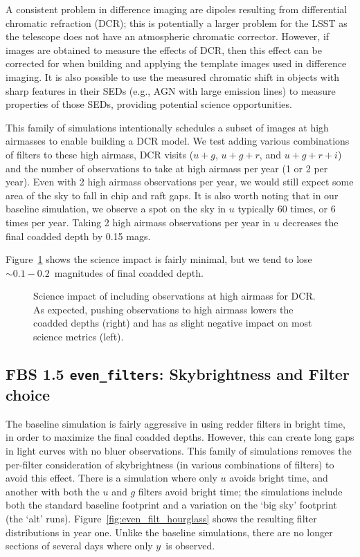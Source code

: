 A consistent problem in difference imaging are dipoles resulting from differential chromatic refraction (DCR); this is potentially a larger problem for the LSST as the telescope does not have an atmospheric chromatic corrector. However, if images are obtained to measure the effects of DCR, then this effect can be corrected for when building and applying the template images used in difference imaging. It is also possible to use the measured chromatic shift in objects with sharp features in their SEDs (e.g., AGN with large emission lines) to measure properties of those SEDs, providing potential science opportunities. 

This family of simulations intentionally schedules a subset of images at high airmasses to enable building a DCR model. We test adding various combinations of filters to these high airmass, DCR visits ($u+g$, $u+g+r$, and $u+g+r+i$) and the number of observations to take at high airmass per year (1 or 2 per year).  Even with 2 high airmass observations per year, we would still expect some area of the sky to fall in chip and raft gaps.  It is also worth noting that in our baseline simulation, we observe a spot on the sky in $u$ typically 60 times, or 6 times per year. Taking 2 high airmass observations per year in $u$ decreases the final coadded depth by 0.15 mags.

Figure~\ref{fig:dcr_radar} shows the science impact is fairly minimal, but we tend to lose $\sim0.1-0.2$\ magnitudes of final coadded depth.

\begin{figure}
\caption{Science impact of including observations at high airmass for DCR. As expected, pushing observations to high airmass lowers the coadded depths (right) and has as slight negative impact on most science metrics (left).}\label{fig:dcr_radar}
\end{figure}


\subsection{FBS 1.5 {\tt even\_filters}: Skybrightness and Filter choice}

The baseline simulation is fairly aggressive in using redder filters in bright time, in order to maximize the final coadded depths. However, this can create long gaps in light curves with no bluer observations. This family of simulations removes the per-filter consideration of skybrightness (in various combinations of filters) to avoid this effect. There is a simulation where only $u$ avoids bright time, and another with both the $u$ and $g$ filters avoid bright time; the simulations include both the standard baseline footprint and a variation on the `big sky' footprint (the `alt' runs). Figure~\ref{fig:even_filt_hourglass} shows the resulting filter distributions in year one. Unlike the baseline simulations, there are no longer sections of several days where only $y$\ is observed.

